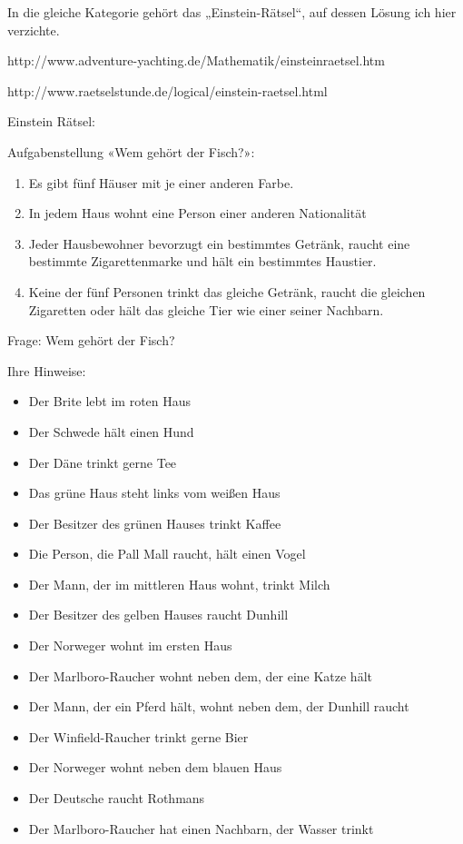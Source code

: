 {\newpage

In die gleiche Kategorie gehört das „Einstein-Rätsel“, auf dessen Lösung ich hier
verzichte.

http://www.adventure-yachting.de/Mathematik/einsteinraetsel.htm

http://www.raetselstunde.de/logical/einstein-raetsel.html

Einstein Rätsel:

Aufgabenstellung «Wem gehört der Fisch?»:

\begin{enumerate}
\item
 Es gibt fünf Häuser mit je einer anderen Farbe.
 \item
  In jedem Haus wohnt eine Person einer anderen Nationalität
  \item
   Jeder Hausbewohner bevorzugt ein bestimmtes Getränk,
raucht eine bestimmte Zigarettenmarke und hält ein
bestimmtes Haustier.
\item
 Keine der fünf Personen trinkt das gleiche Getränk, raucht
die gleichen Zigaretten oder hält das gleiche Tier wie einer
seiner Nachbarn.
\end{enumerate}

Frage: Wem gehört der Fisch?

Ihre Hinweise:

\begin{itemize}
\item Der Brite lebt im roten Haus
\item Der Schwede hält einen Hund
\item Der Däne trinkt gerne Tee
\item Das grüne Haus steht links vom weißen Haus
\item Der Besitzer des grünen Hauses trinkt Kaffee
\item Die Person, die Pall Mall raucht, hält einen Vogel
\item Der Mann, der im mittleren Haus wohnt, trinkt Milch
\item Der Besitzer des gelben Hauses raucht Dunhill
\item Der Norweger wohnt im ersten Haus
\item Der Marlboro-Raucher wohnt neben dem, der eine Katze hält
\item Der Mann, der ein Pferd hält, wohnt neben dem, der Dunhill raucht
\item Der Winfield-Raucher trinkt gerne Bier
\item Der Norweger wohnt neben dem blauen Haus
\item Der Deutsche raucht Rothmans
\item Der Marlboro-Raucher hat einen Nachbarn, der Wasser trinkt
\end{itemize}

\newpage
}%




